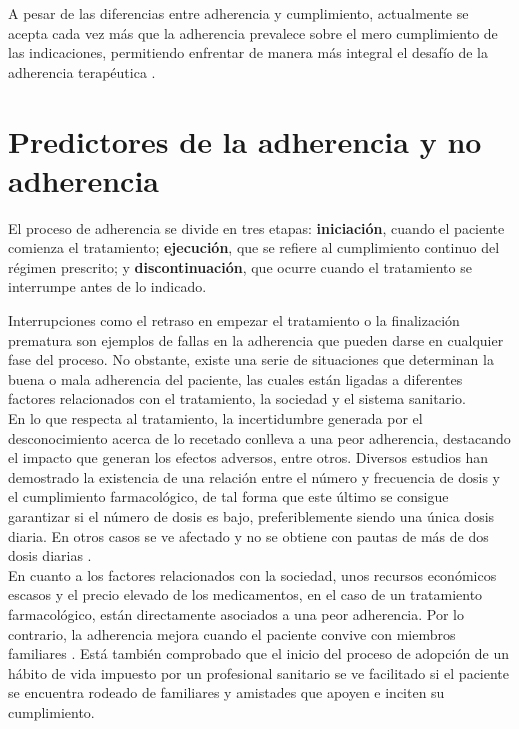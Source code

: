 A pesar de las diferencias entre adherencia y cumplimiento, actualmente se acepta cada vez más que la adherencia prevalece sobre el mero cumplimiento de las indicaciones, permitiendo enfrentar de manera más integral el desafío de la adherencia terapéutica \cite{farmaindustria2023adherencia}.


\section{Predictores de la adherencia y no adherencia}

El proceso de adherencia se divide en tres etapas: \textbf{iniciación}, cuando el paciente comienza el tratamiento; \textbf{ejecución}, que se refiere al cumplimiento continuo del régimen prescrito; y \textbf{discontinuación}, que ocurre cuando el tratamiento se interrumpe antes de lo indicado. 

Interrupciones como el retraso en empezar el tratamiento o la finalización prematura son ejemplos de fallas en la adherencia que pueden darse en cualquier fase del proceso. No obstante, existe una serie de situaciones que determinan la buena o mala adherencia del paciente, las cuales están ligadas a diferentes factores relacionados con el tratamiento, la sociedad y el sistema sanitario.\\

En lo que respecta al tratamiento, la incertidumbre generada por el desconocimiento acerca de lo recetado conlleva a una peor adherencia, destacando el impacto que generan los efectos adversos, entre otros. Diversos estudios han demostrado la existencia de una relación entre el número y frecuencia de dosis y el cumplimiento farmacológico, de tal forma que este último se consigue garantizar si el número de dosis es bajo, preferiblemente siendo una única dosis diaria. En otros casos se ve afectado y no se obtiene con pautas de más de dos dosis diarias \cite{Claxton2001}. \\

En cuanto a los factores relacionados con la sociedad, unos recursos económicos escasos y el precio elevado de los medicamentos, en el caso de un tratamiento farmacológico, están directamente asociados a una peor adherencia. Por lo contrario, la adherencia mejora cuando el paciente convive con miembros familiares \cite{libroblanco2021}. Está también comprobado que el inicio del proceso de adopción de un hábito de vida impuesto por un profesional sanitario se ve facilitado si el paciente se encuentra rodeado de familiares y amistades que apoyen e inciten su cumplimiento.\\

